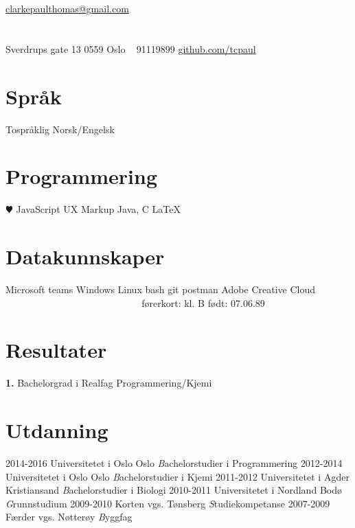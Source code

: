 \documentclass[]{friggeri-cv}
\begin{document}
       {\Letter \href{mailto:clarkepaulthomas@gmail.com}{ clarkepaulthomas@gmail.com}}


\begin{aside}
  \section{}{Sverdrups gate 13 } 
    0559 Oslo
    ~
    {91119899 } \Mobilefone 
    \href{https://github.com/tcpaul}{github.com/tcpaul } \faGithub
  \section{Språk}
    Tospråklig Norsk/Engelsk
  \section{Programmering}
    {\color{red} $\varheartsuit$} JavaScript
    UX Markup
    Java, C
    \LaTeX
  \section{Datakunnskaper}
    Microsoft teams
    Windows
    Linux
    bash
    git
    postman
    Adobe Creative Cloud
    ~
    ~
    ~
    ~
    ~
    ~
    ~
    ~
    ~
    ~
    ~
    ~
    ~
    ~
    ~
    ~
    ~
    ~
    ~
    ~
    ~
    førerkort: kl. B
    født: 07.06.89
\end{aside}

\section{Resultater \faTrophy}

\begin{entrylist}
  \entry
    {\textbf{1.}}
    {Bachelorgrad i Realfag Programmering/Kjemi}
    {}
    {}
\end{entrylist}

\section{Utdanning}

\begin{entrylist}
  \entry
    {2014-2016}
    {Universitetet i Oslo}
    {Oslo}
    {\emph Bachelorstudier i Programmering}
  \entry
    {2012-2014}
    {Universitetet i Oslo}
    {Oslo}
    {\emph Bachelorstudier i Kjemi}  
  \entry
    {2011-2012}
    {Universitetet i Agder}
    {Kristiansand}
    {\emph Bachelorstudier i Biologi}
  \entry
    {2010-2011}
    {Universitetet i Nordland}
    {Bodø}
    {\emph Grunnstudium}
  \entry
    {2009-2010}
    {Korten vgs.}
    {Tønsberg}
    {\emph Studiekompetanse}
  \entry
    {2007-2009}
    {Færder vgs.}
    {Nøtterøy}
    {\emph Byggfag}
\end{entrylist}
\end{document}
